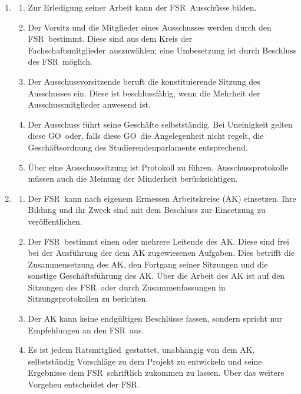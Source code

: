 \documentclass[a4paper, 12pt, ngerman]{article}
\newcommand{\rat}{FSR}
\newcommand{\rates}{FSR}
\newcommand{\go}{GO}
\newcommand{\mitglied}{Ratsmitglied}
\newcommand{\fsmitglieder}{Fachschaftsmitglieder}
\begin{document}
\begin{enumerate}[leftmargin=0cm]
	
	\item {}\label{ausschuss}
	
	\begin{enumerate}[leftmargin=0cm]
		\item Zur Erledigung seiner Arbeit kann der \rat~Ausschüsse bilden.
		\item Der Vorsitz und die Mitglieder eines Ausschusses werden durch den \rat~bestimmt. Diese sind aus dem Kreis der \fsmitglieder~auszuwählen; eine Umbesetzung ist durch Beschluss des \rates~möglich.
		\item Der Ausschussvorsitzende beruft die konstituierende Sitzung des Ausschusses ein. Diese ist beschlussfähig, wenn die Mehrheit der Ausschussmitglieder anwesend ist.
		\item Der Ausschuss führt seine Geschäfte selbstständig. Bei Uneinigkeit gelten diese \go~oder, falls diese \go~die Angelegenheit nicht regelt, die Geschäftsordnung des Studierendenparlaments entsprechend. 
		\item Über eine Ausschusssitzung ist Protokoll zu führen. Ausschussprotokolle müssen auch die Meinung der Minderheit berücksichtigen.
	\end{enumerate}

	\item {}\label{arbeitskreis}
	
	\begin{enumerate}[leftmargin=0cm]
		\item Der \rat~kann nach eigenem Ermessen Arbeitskreise (AK) einsetzen. Ihre Bildung und ihr Zweck sind mit dem Beschluss zur Einsetzung zu veröffentlichen.
		\item Der \rat~bestimmt einen oder mehrere Leitende des AK. Diese sind frei bei der Ausführung der dem AK zugewiesenen Aufgaben. Dies betrifft die Zusammensetzung des AK, den Fortgang seiner Sitzungen und die sonstige Geschäftsführung des AK. Über die Arbeit des AK ist auf den Sitzungen des \rates~oder durch Zusammenfassungen in Sitzungsprotokollen zu berichten.
		\item Der AK kann keine endgültigen Beschlüsse fassen, sondern spricht nur Empfehlungen an den \rat~aus.
		\item Es ist jedem \mitglied~gestattet, unabhängig von dem AK, selbstständig Vorschläge zu dem Projekt zu entwickeln und seine Ergebnisse dem \rat~schriftlich zukommen zu lassen. Über das weitere Vorgehen entscheidet der \rat.
	\end{enumerate}


\end{enumerate}
\end{document}
